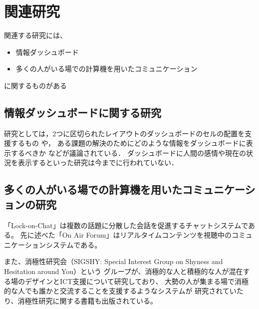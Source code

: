 \section{関連研究}
関連する研究には、
\begin{itemize}
\item 情報ダッシュボード
\item 多くの人がいる場での計算機を用いたコミュニケーション
\end{itemize}
に関するものがある

\subsection{情報ダッシュボードに関する研究}
研究としては，2つに区切られたレイアウトのダッシュボードのセルの配置を支援するもの
\cite{Hertzog:2015:BSP:2678025.2701383}や，
ある課題の解決のためにどのような情報をダッシュボードに表示するべきか
\cite{Jones:2015:ECI:2800835.2800963}などが議論されている．
ダッシュボードに人間の感情や現在の状況を表示するといった研究は今までに行われていない．

\subsection{多くの人がいる場での計算機を用いたコミュニケーションの研究}
「Lock-on-Chat\cite{nishida2006}」は複数の話題に分散した会話を促進するチャットシステムである。
先に述べた「On Air Forum」はリアルタイムコンテンツを視聴中のコミュニケーションシステムである。

また、消極性研究会（SIGSHY: Special Interest Group on Shyness and Hesitation around You）という
グループが、消極的な人と積極的な人が混在する場のデザインとICT支援について研究しており、
大勢の人が集まる場で消極的な人でも誰かと交流することを支援するようなシステム\cite{nishida2011}が
研究されていたり、消極性研究に関する書籍\cite{kurihara2016}も出版されている。
